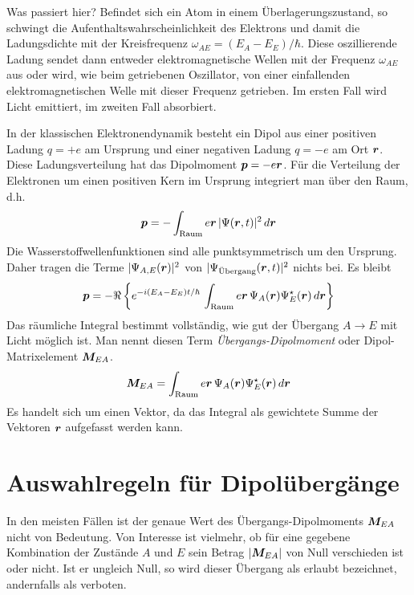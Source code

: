 Was passiert hier? Befindet sich ein Atom in einem Überlagerungszustand, so schwingt die Aufenthaltswahrscheinlichkeit des Elektrons und damit die Ladungsdichte mit der Kreisfrequenz $\omega_{AE} = (E_A - E_E) / \hbar $. Diese oszillierende Ladung sendet dann entweder elektromagnetische Wellen mit der Frequenz $\omega_{AE}$ aus oder wird, wie beim getriebenen Oszillator, von einer einfallenden elektromagnetischen Welle mit dieser Frequenz getrieben. Im ersten Fall wird Licht emittiert, im zweiten Fall absorbiert.

In der klassischen Elektronendynamik besteht ein Dipol aus einer positiven Ladung $q=+e$ am Ursprung und einer negativen Ladung $q=-e$ am Ort $\boldsymbol{r}$. Diese Ladungsverteilung hat das Dipolmoment $\boldsymbol{p} = -e \boldsymbol{r}$. Für die Verteilung der Elektronen um einen positiven Kern im Ursprung integriert man über den Raum, d.h. 
\begin{equation}
    \boldsymbol{p} = - \int_\text{Raum} e\boldsymbol{r} \,  | \Psi(\boldsymbol{r}, t) |^2 \, d \boldsymbol{r} 
\end{equation}
Die Wasserstoffwellenfunktionen sind alle punktsymmetrisch um den Ursprung. Daher tragen die Terme $ | \Psi_{A,E}(\boldsymbol{r})|^2$ von $| \Psi_\text{Übergang}(\boldsymbol{r},t)|^2$ nichts bei. Es bleibt 
\begin{equation}
    \boldsymbol{p} =  - \Re \left \{ e^{-i (E_A - E_E) t / \hbar}  \, \int_\text{Raum} e\boldsymbol{r} \,  \Psi_A(\boldsymbol{r})\Psi_E^\star(\boldsymbol{r})  \, d \boldsymbol{r} \right \}
\end{equation}
Das räumliche Integral bestimmt vollständig, wie gut der Übergang $A \rightarrow E$ mit Licht möglich ist. Man nennt diesen Term \emph{Übergangs-Dipolmoment} oder Dipol-Matrixelement $\boldsymbol{M}_{EA}$.
\begin{equation}
    \boldsymbol{M}_{EA} = \int_\text{Raum} e\boldsymbol{r} \,  \Psi_A(\boldsymbol{r})\Psi_E^\star(\boldsymbol{r})  \, d \boldsymbol{r} 
    \label{eq:7_Matrix_element}
\end{equation}
Es handelt sich um einen Vektor, da das Integral als gewichtete Summe der Vektoren $\boldsymbol{r}$ aufgefasst werden kann.


\section{Auswahlregeln für Dipolübergänge}

In den meisten Fällen ist der genaue Wert des Übergangs-Dipolmoments $\boldsymbol{M}_{EA}$ nicht von Bedeutung. Von Interesse ist vielmehr, ob 
für eine gegebene Kombination der Zustände $A$ und $E$ sein Betrag $|\boldsymbol{M}_{EA}|$ von Null verschieden ist oder nicht. Ist er ungleich Null, so wird dieser Übergang als erlaubt bezeichnet, andernfalls als verboten. 

